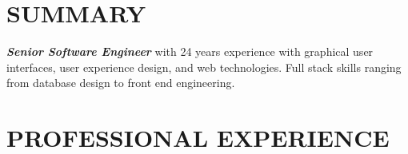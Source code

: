 \documentclass[margin,line]{resume}
\begin{document}
\begin{resume}

    \vspace{-3mm}

    \section{\mysidestyle \textbf{\large{S}\small{UMMARY}}}

    \textbf{\textsl{Senior Software Engineer}} with 24 years experience  with graphical  user interfaces, user experience design, and web technologies.  Full stack skills ranging from database design to front end engineering.\vspace{-1mm}

\sectionline

    \section{\mysidestyle \textbf{\large{P}\small{ROFESSIONAL} \large{E}\small{XPERIENCE}}}


\end{resume}
\end{document}
